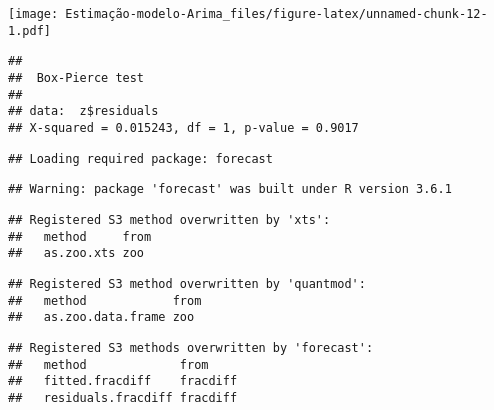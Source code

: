 \documentclass[]{article}
\newenvironment{Shaded}{\begin{snugshade}}{\end{snugshade}}
\newcommand{\CommentTok}[1]{\textcolor[rgb]{0.56,0.35,0.01}{\textit{#1}}}
\newcommand{\DataTypeTok}[1]{\textcolor[rgb]{0.13,0.29,0.53}{#1}}
\newcommand{\DecValTok}[1]{\textcolor[rgb]{0.00,0.00,0.81}{#1}}
\newcommand{\KeywordTok}[1]{\textcolor[rgb]{0.13,0.29,0.53}{\textbf{#1}}}
\newcommand{\NormalTok}[1]{#1}
\newcommand{\OperatorTok}[1]{\textcolor[rgb]{0.81,0.36,0.00}{\textbf{#1}}}
\begin{document}
\texttt{[image: Estimação-modelo-Arima\_files/figure-latex/unnamed-chunk-12-1.pdf]}

\begin{Shaded}
\end{Shaded}

\begin{verbatim}
## 
##  Box-Pierce test
## 
## data:  z$residuals
## X-squared = 0.015243, df = 1, p-value = 0.9017
\end{verbatim}

\begin{Shaded}
\end{Shaded}

\begin{verbatim}
## Loading required package: forecast
\end{verbatim}

\begin{verbatim}
## Warning: package 'forecast' was built under R version 3.6.1
\end{verbatim}

\begin{verbatim}
## Registered S3 method overwritten by 'xts':
##   method     from
##   as.zoo.xts zoo
\end{verbatim}

\begin{verbatim}
## Registered S3 method overwritten by 'quantmod':
##   method            from
##   as.zoo.data.frame zoo
\end{verbatim}

\begin{verbatim}
## Registered S3 methods overwritten by 'forecast':
##   method             from    
##   fitted.fracdiff    fracdiff
##   residuals.fracdiff fracdiff
\end{verbatim}
\end{document}
